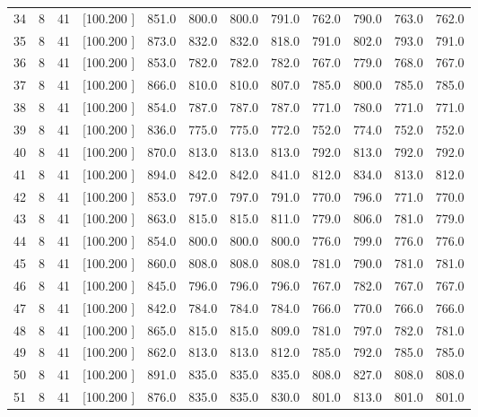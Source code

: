 \documentclass[12pt,a4paper]{article}
\begin{document}
\begin{center}
{\begin{tabular}{r r r r r r r r r r r r}
  34&  8& 41&[100.200   ]&   851.0&   800.0&   800.0&   791.0&   762.0&   790.0&   763.0&   762.0\\[-0.02in]
  35&  8& 41&[100.200   ]&   873.0&   832.0&   832.0&   818.0&   791.0&   802.0&   793.0&   791.0\\[-0.02in]
  36&  8& 41&[100.200   ]&   853.0&   782.0&   782.0&   782.0&   767.0&   779.0&   768.0&   767.0\\[-0.02in]
  37&  8& 41&[100.200   ]&   866.0&   810.0&   810.0&   807.0&   785.0&   800.0&   785.0&   785.0\\[-0.02in]
  38&  8& 41&[100.200   ]&   854.0&   787.0&   787.0&   787.0&   771.0&   780.0&   771.0&   771.0\\[-0.02in]
  39&  8& 41&[100.200   ]&   836.0&   775.0&   775.0&   772.0&   752.0&   774.0&   752.0&   752.0\\[-0.02in]
  40&  8& 41&[100.200   ]&   870.0&   813.0&   813.0&   813.0&   792.0&   813.0&   792.0&   792.0\\[-0.02in]
  41&  8& 41&[100.200   ]&   894.0&   842.0&   842.0&   841.0&   812.0&   834.0&   813.0&   812.0\\[-0.02in]
  42&  8& 41&[100.200   ]&   853.0&   797.0&   797.0&   791.0&   770.0&   796.0&   771.0&   770.0\\[-0.02in]
  43&  8& 41&[100.200   ]&   863.0&   815.0&   815.0&   811.0&   779.0&   806.0&   781.0&   779.0\\[-0.02in]
  44&  8& 41&[100.200   ]&   854.0&   800.0&   800.0&   800.0&   776.0&   799.0&   776.0&   776.0\\[-0.02in]
  45&  8& 41&[100.200   ]&   860.0&   808.0&   808.0&   808.0&   781.0&   790.0&   781.0&   781.0\\[-0.02in]
  46&  8& 41&[100.200   ]&   845.0&   796.0&   796.0&   796.0&   767.0&   782.0&   767.0&   767.0\\[-0.02in]
  47&  8& 41&[100.200   ]&   842.0&   784.0&   784.0&   784.0&   766.0&   770.0&   766.0&   766.0\\[-0.02in]
  48&  8& 41&[100.200   ]&   865.0&   815.0&   815.0&   809.0&   781.0&   797.0&   782.0&   781.0\\[-0.02in]
  49&  8& 41&[100.200   ]&   862.0&   813.0&   813.0&   812.0&   785.0&   792.0&   785.0&   785.0\\[-0.02in]
  50&  8& 41&[100.200   ]&   891.0&   835.0&   835.0&   835.0&   808.0&   827.0&   808.0&   808.0\\[-0.02in]
  51&  8& 41&[100.200   ]&   876.0&   835.0&   835.0&   830.0&   801.0&   813.0&   801.0&   801.0\\[-0.02in]

\end{tabular}}
\end{center}
\end{document}
